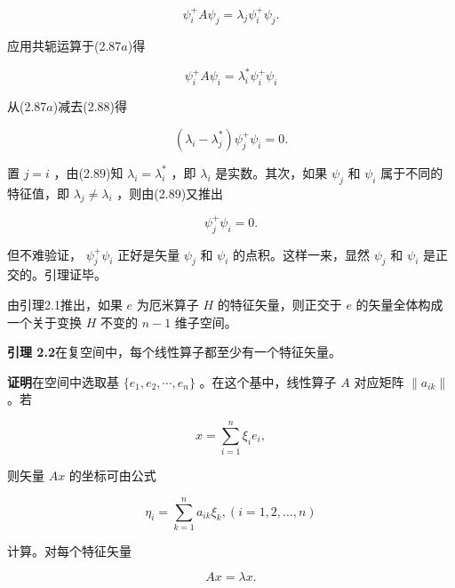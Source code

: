 \begin{equation*}
\psi_ {i} ^ {+} A \psi_ {j} = \lambda_ {j} \psi_ {i} ^ {+} \psi_ {j}.\tag{2.87b}
\end{equation*}

应用共轭运算于(2.87$a$)得

\begin{equation*}
\psi_ {i} ^ {+} A \psi_ {i} = \lambda_ {i} ^ {*} \psi_ {i} ^ {+} \psi_ {i}\tag{2.88}
\end{equation*}

从(2.87$a$)减去(2.88)得

\begin{equation*}
(\lambda_ {i} - \lambda_ {j} ^ {*}) \psi_ {j} ^ {+} \psi_ {i} = 0.\tag{2.89}
\end{equation*}

置 $j = i$ ，由(2.89)知 $\lambda_{i} = \lambda_{i}^{*}$ ，即 $\lambda_{i}$ 是实数。其次，如果 $\psi_{j}$ 和 $\psi_{i}$ 属于不同的特征值，即 $\lambda_{j}\neq \lambda_{i}$ ，则由(2.89)又推出

\begin{equation*}
\psi_ {j} ^ {+} \psi_ {i} = 0.
\end{equation*}

但不难验证， $\psi_{j}^{+}\psi_{i}$ 正好是矢量 $\psi_{j}$ 和 $\psi_{i}$ 的点积。这样一来，显然 $\psi_{j}$ 和 $\psi_{i}$ 是正交的。引理证毕。

由引理2.1推出，如果 $e$ 为厄米算子 $H$ 的特征矢量，则正交于 $e$ 的矢量全体构成一个关于变换 $H$ 不变的 $n - 1$ 维子空间。

\textbf{引理 2.2}\quad 在复空间中，每个线性算子都至少有一个特征矢量。

\textbf{证明}\quad 在空间中选取基 $\{e_{1}, e_{2}, \cdots, e_{n}\}$ 。在这个基中，线性算子 $A$ 对应矩阵 $\|a_{ik}\|$ 。若

\begin{equation*}
x = \sum_ {i = 1} ^ {n} \xi_ {i} e _ {i},
\end{equation*}

则矢量 $Ax$ 的坐标可由公式

\begin{equation*}
\eta_ {i} = \sum_ {k = 1} ^ {n} a _ {i k} \xi_ {k}, (i = 1, 2, \dots , n)\tag{2.90}
\end{equation*}

计算。对每个特征矢量

\begin{equation*}
A x = \lambda x.
\end{equation*}

